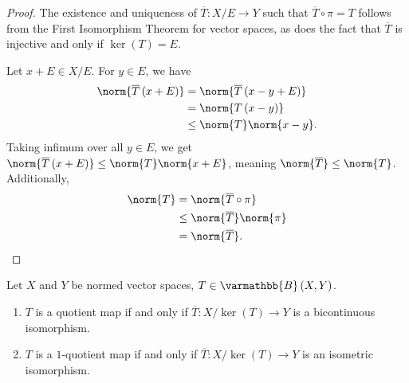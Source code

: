 \documentclass[10pt]{mypackage}
\renewcommand*{\mathbb}[1]{\varmathbb{#1}}
\newcommand{\B}{\mathbb{B}}
\begin{document}
\begin{proof}
  The existence and uniqueness of $\overline{T}: X/E\rightarrow Y$ such that $\overline{T}\circ \pi = T$ follows from the First Isomorphism Theorem for vector spaces, as does the fact that $\overline{T}$ is injective and only if $\ker(T) = E$.\newline

  Let $x+E\in X/E$. For $y\in E$, we have
  \begin{align*}
    \norm{\overline{T}\left(x+E\right)} &= \norm{\overline{T}\left(x-y+E\right)}\\
                                        &= \norm{T\left(x-y\right)}\\
                                        &\leq \norm{T}\norm{x-y}.
  \end{align*}
  Taking infimum over all $y\in E$, we get $\norm{\overline{T}\left(x+E\right)} \leq \norm{T}\norm{x+E}$, meaning $\norm{\overline{T}}\leq \norm{T}$. Additionally,
  \begin{align*}
    \norm{T} &= \norm{\overline{T}\circ \pi}\\
             &\leq \norm{\overline{T}}\norm{\pi}\\
             &= \norm{\overline{T}}.
  \end{align*}
\end{proof}
\begin{theorem}
  Let $X$ and $Y$ be normed vector spaces, $T\in \B\left(X,Y\right)$.
  \begin{enumerate}[(1)]
    \item $T$ is a quotient map if and only if $\overline{T}: X/\ker(T) \rightarrow Y$ is a bicontinuous isomorphism.
    \item $T$ is a $1$-quotient map if and only if $\overline{T}: X/\ker(T) \rightarrow Y$ is an isometric isomorphism.
  \end{enumerate}
\end{theorem}
\end{document}
